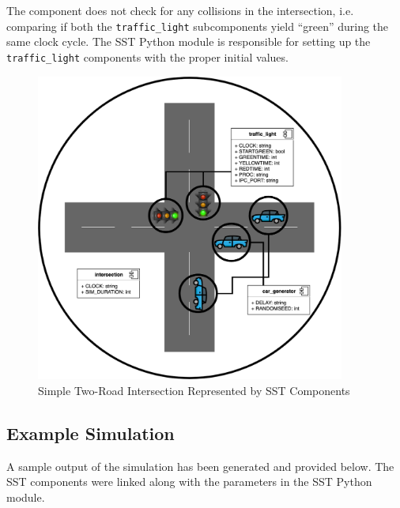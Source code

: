 \documentclass{article}
\begin{document}
      The component does not check for any collisions in the intersection, i.e. comparing if both
      the \lstinline{traffic_light} subcomponents yield ``green'' during the same clock cycle. The
      SST Python module is responsible for setting up the \lstinline{traffic_light} components with
      the proper initial values.

      \begin{figure}[!h]
        \centering
        \includegraphics[width=4in]{diagrams/intersection_comp.png}
        \caption{Simple Two-Road Intersection Represented by SST Components}
        \label{fig:intersection_comp}
      \end{figure}
      \clearpage

    \subsection{Example Simulation}
    A sample output of the simulation has been generated and provided below. The SST components were linked along with the parameters in the SST Python module.
\end{document}
